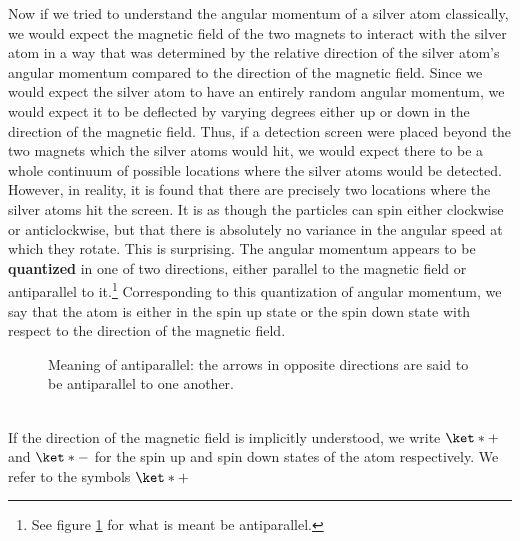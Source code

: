\documentclass[12pt]{report}
\providecommand{\DIFaddbeginFL}{} %
\providecommand{\DIFaddendFL}{} %
\providecommand{\DIFdelbeginFL}{} %
\providecommand{\DIFdelendFL}{} %
\begin{document}
Now if we tried to understand the angular momentum of a silver atom classically, we would expect the magnetic field of the two magnets to interact with the silver atom in a way that was determined by the relative direction of the silver atom's angular momentum compared to the direction of the magnetic field. Since we would expect the silver atom to have an entirely random angular momentum, we would expect it to be deflected by varying degrees either up or down in the direction of the magnetic field. Thus, if a detection screen were placed beyond the two magnets which the silver atoms would hit, we would expect there to be a whole continuum of possible locations where the silver atoms would be detected. However, in reality, it is found that there are precisely two locations where the silver atoms hit the screen. It is as though the particles can spin either clockwise or anticlockwise, but that there is absolutely no variance in the angular speed at which they rotate. This is surprising. The angular momentum appears to be \textbf{quantized} in one of two directions, either parallel to the magnetic field or antiparallel to it.\footnote{See figure \ref{antiparallel} for what is meant be antiparallel.} Corresponding to this quantization of angular momentum, we say that the atom is either in the spin up state or the spin down state with respect to the direction of the magnetic field. 
\begin{figure}[ht!]
\captionsetup{justification=centering}
\centering
{}
\vspace*{10px}
\DIFdelbeginFL %
\DIFdelendFL \DIFaddbeginFL \caption[Meaning of antiparallel]{\DIFaddendFL Meaning of antiparallel: the arrows in opposite directions are said to be antiparallel to one another.}\label{antiparallel}
\end{figure}\\
\noindent If the direction of the magnetic field is implicitly understood, we write $\ket*{+}$ and $\ket*{-}$ for the spin up and spin down states of the atom respectively. We refer to the symbols $\ket*{+}$ %
\end{document}
